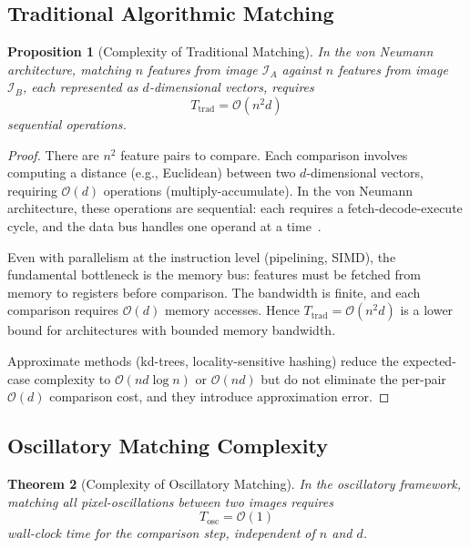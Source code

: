 \documentclass[11pt,twocolumn,a4paper]{article}
\newtheorem{theorem}{Theorem}[section]
\newtheorem{proposition}[theorem]{Proposition}
\newcommand{\BigO}{\mathcal{O}}
\begin{document}
\subsection{Traditional Algorithmic Matching}

\begin{proposition}[Complexity of Traditional Matching]\label{prop:traditional_complexity}
In the von Neumann architecture, matching $n$ features from image $\mathcal{I}_A$ against $n$ features from image $\mathcal{I}_B$, each represented as $d$-dimensional vectors, requires
\begin{equation}
    T_{\text{trad}} = \BigO(n^2 d)
    \label{eq:traditional_complexity}
\end{equation}
sequential operations.
\end{proposition}

\begin{proof}
There are $n^2$ feature pairs to compare. Each comparison involves computing a distance (e.g., Euclidean) between two $d$-dimensional vectors, requiring $\BigO(d)$ operations (multiply-accumulate). In the von Neumann architecture, these operations are sequential: each requires a fetch-decode-execute cycle, and the data bus handles one operand at a time~\citep{vonneumann1945, backus1978}.

Even with parallelism at the instruction level (pipelining, SIMD), the fundamental bottleneck is the memory bus: features must be fetched from memory to registers before comparison. The bandwidth is finite, and each comparison requires $\BigO(d)$ memory accesses. Hence $T_{\text{trad}} = \BigO(n^2 d)$ is a lower bound for architectures with bounded memory bandwidth.

Approximate methods (kd-trees, locality-sensitive hashing) reduce the expected-case complexity to $\BigO(n d \log n)$ or $\BigO(nd)$ but do not eliminate the per-pair $\BigO(d)$ comparison cost, and they introduce approximation error.
\end{proof}

\subsection{Oscillatory Matching Complexity}

\begin{theorem}[Complexity of Oscillatory Matching]\label{thm:oscillatory_complexity}
In the oscillatory framework, matching all pixel-oscillations between two images requires
\begin{equation}
    T_{\text{osc}} = \BigO(1)
    \label{eq:oscillatory_complexity}
\end{equation}
wall-clock time for the comparison step, independent of $n$ and $d$.
\end{theorem}
\end{document}
